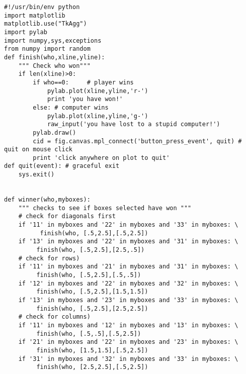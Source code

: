 {\singlespacing \color{blue}\begin{verbatim}
#!/usr/bin/env python
import matplotlib
matplotlib.use("TkAgg")
import pylab
import numpy,sys,exceptions
from numpy import random
def finish(who,xline,yline):
    """ Check who won"""
    if len(xline)>0:
        if who==0:     # player wins
            pylab.plot(xline,yline,'r-')
            print 'you have won!'
        else: # computer wins
            pylab.plot(xline,yline,'g-')
            raw_input('you have lost to a stupid computer!')
        pylab.draw()
        cid = fig.canvas.mpl_connect('button_press_event', quit) # quit on mouse click
        print 'click anywhere on plot to quit'
def quit(event): # graceful exit
    sys.exit() 


def winner(who,myboxes):  
    """ checks to see if boxes selected have won """
    # check for diagonals first 
    if '11' in myboxes and '22' in myboxes and '33' in myboxes: \
          finish(who, [.5,2.5],[.5,2.5])
    if '13' in myboxes and '22' in myboxes and '31' in myboxes: \
         finish(who, [.5,2.5],[2.5,.5])
    # check for rows)
    if '11' in myboxes and '21' in myboxes and '31' in myboxes: \
         finish(who, [.5,2.5],[.5,.5])
    if '12' in myboxes and '22' in myboxes and '32' in myboxes: \
         finish(who, [.5,2.5],[1.5,1.5])
    if '13' in myboxes and '23' in myboxes and '33' in myboxes: \
         finish(who, [.5,2.5],[2.5,2.5])
    # check for columns)
    if '11' in myboxes and '12' in myboxes and '13' in myboxes: \
         finish(who, [.5,.5],[.5,2.5])
    if '21' in myboxes and '22' in myboxes and '23' in myboxes: \
         finish(who, [1.5,1.5],[.5,2.5])
    if '31' in myboxes and '32' in myboxes and '33' in myboxes: \
         finish(who, [2.5,2.5],[.5,2.5])


\end{verbatim}}

